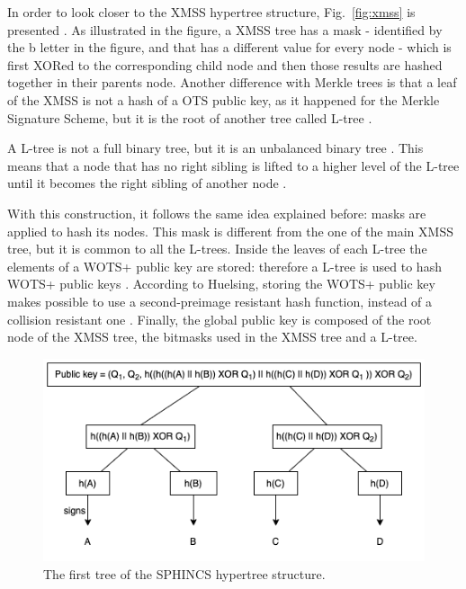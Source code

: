 \documentclass[a4paper,12pt]{article}
\def\myfig#1{Fig.~#1\xspace}
\begin{document}
In order to look closer to the XMSS hypertree structure, \myfig{\ref{fig:xmss}} is presented \cite{53_hbs}. As illustrated in the figure, a XMSS tree has a mask - identified by the b letter in the figure, and that has a different value for every node - which is first XORed to the corresponding child node and then those results are hashed together in their parents node.
Another difference with Merkle trees is that a leaf of the XMSS is not a hash of a OTS public key, as it happened for the Merkle Signature Scheme, but it is the root of another tree called L-tree \cite{32_XMSS}.

A L-tree is not a full binary tree, but it is an unbalanced binary tree \cite{1_sphincspaper}.
This means that a node that has no right sibling is lifted to a higher level of the L-tree until it becomes the right sibling of another node \cite{32_XMSS}.

With this construction, it follows the same idea explained before: masks are applied to hash its nodes. This mask is different from the one of the main XMSS tree, but it is common to all the L-trees. Inside the leaves of each L-tree the elements of a WOTS+ public key are stored: therefore a L-tree is used to hash WOTS+ public keys \cite{1_sphincspaper}.
According to Huelsing, storing the WOTS+ public key makes possible to use a second-preimage resistant hash function, instead of a collision resistant one \cite{53_hbs}.
Finally, the global public key is composed of the root node of the XMSS tree, the bitmasks used in the XMSS tree and a L-tree.

\begin{figure}
\centerline{\includegraphics[scale=0.75]{img/firsttree.png}}
\caption{The first tree of the SPHINCS hypertree structure.}
\label{fig:firsttree}
\end{figure}
\end{document}
